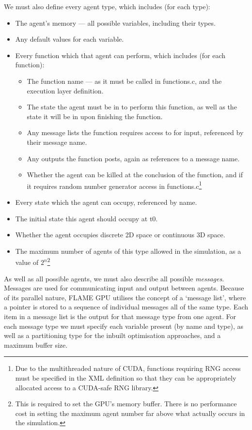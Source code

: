 \documentclass[11pt,a4paper]{article}
\begin{document}
We must also define every agent type, which includes (for each type):
\begin{itemize}
 \item{The agent's memory --- all possible variables, including their types.}
 \item{Any default values for each variable.}
 \item{Every function which that agent can perform, which includes (for each function):}
 \begin{itemize}
  \item{The function name --- as it must be called in functions.c, and the execution layer definition.}
  \item{The state the agent must be in to perform this function, as well as the state it will be in upon finishing the function.}
  \item{Any message lists the function requires access to for input, referenced by their message name.}
  \item{Any outputs the function posts, again as references to a message name.}
  \item{Whether the agent can be killed at the conclusion of the function, and if it requires random number generator access in functions.c\footnote{Due to the multithreaded nature of CUDA, functions requiring RNG access must be specified in the XML definition so that they can be appropriately allocated access to a CUDA-safe RNG library.}}
 \end{itemize}
 \item{Every state which the agent can occupy, referenced by name.}
 \item{The initial state this agent should occupy at t0.}
 \item{Whether the agent occupies discrete 2D space or continuous 3D space.}
 \item{The maximum number of agents of this type allowed in the simulation, as a value of $2^n$\footnote{This is required to set the GPU's memory buffer. There is no performance cost in setting the maximum agent number far above what actually occurs in the simulation.}}
\end{itemize}

As well as all possible agents, we must also describe all possible \emph{messages}. Messages are used for communicating input and output between agents. Because of its parallel nature, FLAME GPU utilises the concept of a `message list', where a pointer is stored to a sequence of individual messages all of the same type. Each item in a message list is the output for that message type from one agent. For each message type we must specify each variable present (by name and type), as well as a partitioning type for the inbuilt optimisation approaches, and a maximum buffer size.
\end{document}
